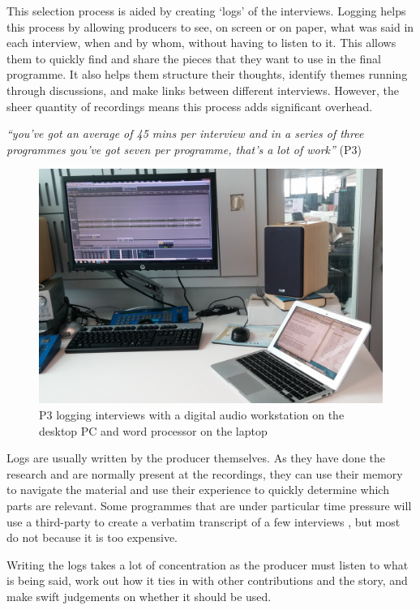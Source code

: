 This selection process is aided by creating `logs' of the interviews.  Logging
helps this process by allowing producers to see, on screen or on paper, what
was said in each interview, when and by whom, without having to listen to it.
This allows them to quickly find and share the pieces that they want to use in
the final programme.  It also helps them structure their thoughts, identify
themes running through discussions, and make links between different
interviews. However, the sheer quantity of recordings means this process adds
significant overhead.

\textit{``you've got an average of 45 mins per interview and in a series of
  three programmes you've got seven per programme, that's a lot of work''} (P3)

\begin{figure}[ht]
\centering
  \includegraphics[width=\columnwidth]{figs/phil-desk.jpg}
  \caption{P3 logging interviews with a digital audio workstation on the desktop
    PC and word processor on the laptop}
  \label{fig:desk}
\end{figure}

Logs are usually written by the producer themselves. As they have done the
research and are normally present at the recordings, they can use their memory
to navigate the material and use their experience to quickly determine which
parts are relevant. Some programmes that are under particular time pressure
will use a third-party to create a verbatim transcript of a few interviews
\citep{Baume2015}, but most do not because it is too expensive.

Writing the logs takes a lot of concentration as the producer must listen to
what is being said, work out how it ties in with other contributions and the
story, and make swift judgements on whether it should be used.

